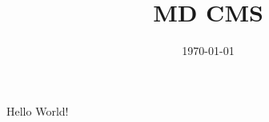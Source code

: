 \documentclass[a4paper]{article}
\title{MD CMS}
\date{\today}
\begin{document}
    \maketitle
    \tableofcontents
    \paragraph{}
    Hello World!
\end{document}
